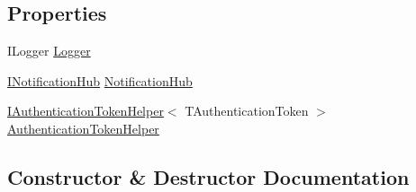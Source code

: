 \subsection*{Properties}
\begin{DoxyCompactItemize}
\item 
I\+Logger \hyperlink{classCqrs_1_1WebApi_1_1Events_1_1Handlers_1_1EventToHubProxy_a120e7cd3ad97d9e6382df657b9c98c4c_a120e7cd3ad97d9e6382df657b9c98c4c}{Logger}
\item 
\hyperlink{interfaceCqrs_1_1WebApi_1_1SignalR_1_1Hubs_1_1INotificationHub}{I\+Notification\+Hub} \hyperlink{classCqrs_1_1WebApi_1_1Events_1_1Handlers_1_1EventToHubProxy_a3e27dc5fb1315bc8200487fbf9b3b47f_a3e27dc5fb1315bc8200487fbf9b3b47f}{Notification\+Hub}
\item 
\hyperlink{interfaceCqrs_1_1Authentication_1_1IAuthenticationTokenHelper}{I\+Authentication\+Token\+Helper}$<$ T\+Authentication\+Token $>$ \hyperlink{classCqrs_1_1WebApi_1_1Events_1_1Handlers_1_1EventToHubProxy_af5593d8e6bace37fa52545c1f8e65e32_af5593d8e6bace37fa52545c1f8e65e32}{Authentication\+Token\+Helper}
\end{DoxyCompactItemize}


\subsection{Constructor \& Destructor Documentation}
\mbox{\label{classCqrs_1_1WebApi_1_1Events_1_1Handlers_1_1EventToHubProxy_a11ce35ab8f01b97b95b757e246c9cdcd_a11ce35ab8f01b97b95b757e246c9cdcd}} 
